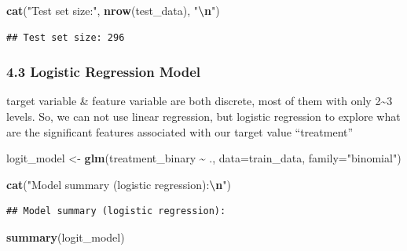 \documentclass[
]{article}
\newenvironment{Shaded}{\begin{snugshade}}{\end{snugshade}}
\newcommand{\AttributeTok}[1]{\textcolor[rgb]{0.13,0.29,0.53}{#1}}
\newcommand{\FunctionTok}[1]{\textcolor[rgb]{0.13,0.29,0.53}{\textbf{#1}}}
\newcommand{\NormalTok}[1]{#1}
\newcommand{\OtherTok}[1]{\textcolor[rgb]{0.56,0.35,0.01}{#1}}
\newcommand{\SpecialCharTok}[1]{\textcolor[rgb]{0.81,0.36,0.00}{\textbf{#1}}}
\newcommand{\StringTok}[1]{\textcolor[rgb]{0.31,0.60,0.02}{#1}}
\begin{document}
\begin{Shaded}
\begin{Highlighting}[]
\FunctionTok{cat}\NormalTok{(}\StringTok{"Test set size:"}\NormalTok{, }\FunctionTok{nrow}\NormalTok{(test\_data), }\StringTok{"}\SpecialCharTok{\textbackslash{}n}\StringTok{"}\NormalTok{)}
\end{Highlighting}
\end{Shaded}

\begin{verbatim}
## Test set size: 296
\end{verbatim}

\subsubsection{4.3 Logistic Regression
Model}\label{logistic-regression-model}

target variable \& feature variable are both discrete, most of them with
only 2\textasciitilde3 levels. So, we can not use linear regression, but
logistic regression to explore what are the significant features
associated with our target value ``treatment''

\begin{Shaded}
\begin{Highlighting}[]
\NormalTok{logit\_model }\OtherTok{\textless{}{-}} \FunctionTok{glm}\NormalTok{(treatment\_binary }\SpecialCharTok{\textasciitilde{}}\NormalTok{ ., }\AttributeTok{data=}\NormalTok{train\_data, }\AttributeTok{family=}\StringTok{"binomial"}\NormalTok{)}

\FunctionTok{cat}\NormalTok{(}\StringTok{"Model summary (logistic regression):}\SpecialCharTok{\textbackslash{}n}\StringTok{"}\NormalTok{)}
\end{Highlighting}
\end{Shaded}

\begin{verbatim}
## Model summary (logistic regression):
\end{verbatim}

\begin{Shaded}
\begin{Highlighting}[]
\FunctionTok{summary}\NormalTok{(logit\_model)}
\end{Highlighting}
\end{Shaded}
\end{document}
